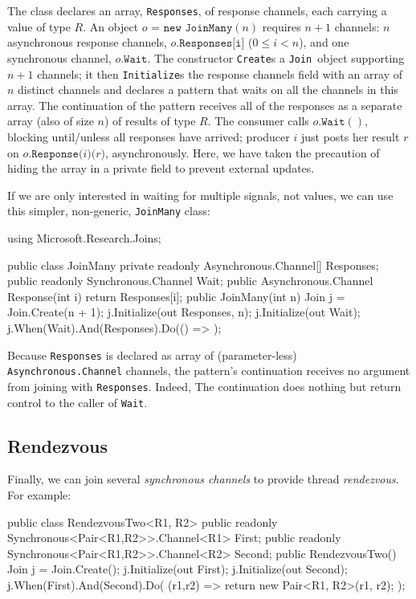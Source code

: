 \documentclass{article}
\newcommand{\cjoin}{{\texttt{Join}}}
\newcommand{\Initialize}{\texttt{Initialize}}
\newcommand{\tvarr}{\ensuremath{R}}
\begin{document}
The class declares an array, \texttt{Responses}, of response channels, each carrying a value of type \tvarr.
An object $o\texttt{ = new JoinMany}(n)$ requires $n+1$ channels: $n$ asynchronous response channels, $o\texttt{.Responses[i]}$ ($ 0\leq i < n$), and one synchronous channel, $o\texttt{.Wait}$.
The constructor \texttt{Create}s a \cjoin\ object supporting $n+1$ channels; 
it then {\Initialize}s the response channels field with an array of $n$ distinct channels and declares a pattern 
that waits on all the channels in this array. 
The continuation of the pattern receives all of the responses as a separate array (also of size $n$) of results of type $\tvarr$.
The consumer calls $o\texttt{.Wait}()$, blocking until/unless all responses have arrived; 
producer $i$ just posts her result $r$ on $o\texttt{.Response(}i\texttt{)(}r{)}$, asynchronously.
Here, we have taken the precaution of hiding the array in a private field to prevent external updates.

If we are only interested in waiting for multiple signals, not values, we can use this simpler, non-generic, \texttt{JoinMany} class:

\begin{lstcsharp}
using Microsoft.Research.Joins;

public class JoinMany {
  private readonly Asynchronous.Channel[] Responses;
  public readonly Synchronous.Channel Wait;
  public Asynchronous.Channel Response(int i) {
    return Responses[i];
  }
  public JoinMany(int n) {
    Join j = Join.Create(n + 1);
    j.Initialize(out Responses, n);
    j.Initialize(out Wait);
    j.When(Wait).And(Responses).Do(() => { });
  }
}
\end{lstcsharp}

Because \texttt{Responses} is declared as array of (parameter-less) \texttt{Asynchronous.Channel} channels, the pattern's continuation 
receives no argument from joining with \texttt{Responses}. Indeed,
The continuation does nothing but return control to the caller of \texttt{Wait}.


\subsection{Rendezvous}\label{sec:dynamicjoins}

Finally, we can join several \emph{synchronous channels} to provide thread \emph{rendezvous}. For example:

\begin{lstcsharp}
public class RendezvousTwo<R1, R2> {
  public readonly Synchronous<Pair<R1,R2>>.Channel<R1> First; 
  public readonly Synchronous<Pair<R1,R2>>.Channel<R2> Second;
  public RendezvousTwo(){
    Join j = Join.Create();
    j.Initialize(out First);
    j.Initialize(out Second);
    j.When(First).And(Second).Do(
      (r1,r2) =>
      {
        return new Pair<R1, R2>(r1, r2);
      });
 }
}
\end{lstcsharp}
\end{document}
